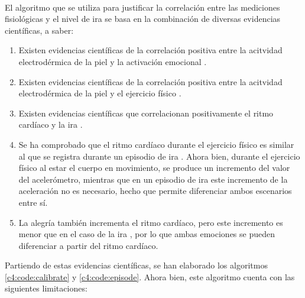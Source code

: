 \paragraph{}
El algoritmo que se utiliza para justificar la correlación entre las mediciones fisiológicas y el nivel de ira se basa en la combinación de diversas evidencias científicas, a saber:

\begin{enumerate}
    \item Existen evidencias científicas de la correlación positiva entre la acitvidad electrodérmica de la piel y la activación emocional \citep{lang1993looking, bradley2000affective}.
    \item Existen evidencias científicas de la correlación positiva entre la acitvidad electrodérmica de la piel y el ejercicio físico \citep{boettger2010heart}.
    \item Existen evidencias científicas que correlacionan positivamente el ritmo cardíaco y la ira \citep{prkachin1999cardiovascular, ax1953physiological, schwartz1981cardiovascular, funkenstein1955physiology}.
    \item Se ha comprobado que el ritmo cardíaco durante el ejercicio físico es similar al que se registra durante un episodio de ira \citep{sinha1992cardiovascular}. Ahora bien, durante el ejercicio físico al estar el cuerpo en movimiento, se produce un incremento del valor del acelerómetro, mientras que en un episodio de ira este incremento de la aceleración no es necesario, hecho que permite diferenciar ambos escenarios entre sí.
    \item La alegría también incrementa el ritmo cardíaco, pero este incremento es menor que en el caso de la ira \citep{prkachin1999cardiovascular}, por lo que ambas emociones se pueden diferenciar a partir del ritmo cardíaco.
\end{enumerate}

Partiendo de estas evidencias científicas, se han elaborado los algoritmos \ref{c4:code:calibrate} y \ref{c4:code:episode}. Ahora bien, este algoritmo cuenta con las siguientes limitaciones:

